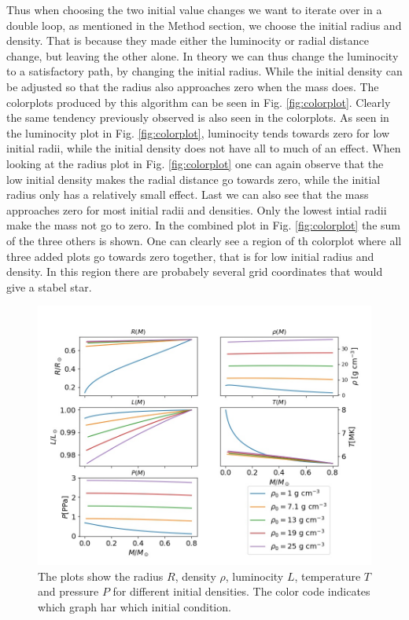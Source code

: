 \documentclass{emulateapj}
\begin{document}
	Thus when choosing the two initial value changes we want to iterate over in a double loop, as mentioned in the Method section, we choose the initial radius and density. That is because they made either the luminocity or radial distance change, but leaving the other alone. In theory we can thus change the luminocity to a satisfactory path, by changing the initial radius. While the initial density can be adjusted so that the radius also approaches zero when the mass does. The colorplots produced by this algorithm can be seen in Fig. \ref{fig:colorplot}. Clearly the same tendency previously observed is also seen in the colorplots. As seen in the luminocity plot in Fig. \ref{fig:colorplot}, luminocity tends towards zero for low initial radii, while the initial density does not have all to much of an effect. When looking at the radius plot in Fig. \ref{fig:colorplot} one can again observe that the low initial density makes the radial distance go towards zero, while the initial radius only has a relatively small effect. Last we can also see that the mass approaches zero for most initial radii and densities. Only the lowest intial radii make the mass not go to zero. In the combined plot in Fig. \ref{fig:colorplot} the sum of the three others is shown. One can clearly see a region of th colorplot where all three added plots go towards zero together, that is for low initial radius and density. In this region there are probabely several grid coordinates that would give a stabel star. 
	\begin{figure}
		\includegraphics[width = \textwidth]{rhoPlot.jpg}
		\caption{The plots show the radius $R$, density $\rho$, luminocity $L$, temperature $T$ and pressure $P$ for different initial densities. The color code indicates which graph har which initial condition.}
		\label{fig:rho}
	\end{figure}
	
\end{document}
